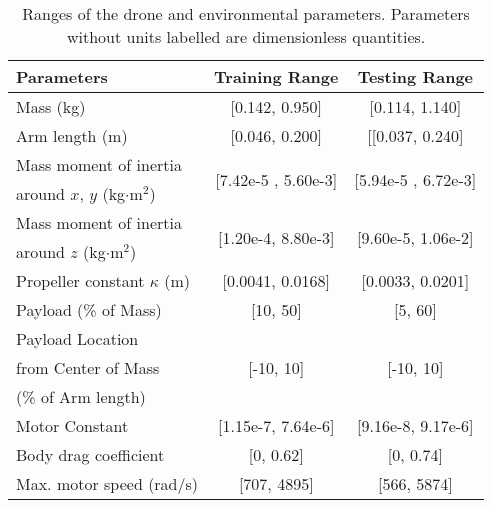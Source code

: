   
\begin{table}[t]
\setlength{\tabcolsep}{5.5pt}
\begin{center}
\begin{tabular}{lcc}
\toprule
 \textbf{Parameters} & \textbf{Training Range} & \textbf{Testing Range} \\
 \midrule
 Mass (kg) & [0.142, 0.950]  & [0.114, 1.140]  \\
 Arm length (m) & [0.046, 0.200] & [[0.037, 0.240] \\
 Mass moment of inertia  & \multirow{2}{*}{ [7.42e-5 , 5.60e-3]}&\multirow{2}{*}{ [5.94e-5 , 6.72e-3]} \\
 around $x$, $y$ (kg$\cdot$m$^2$)&&\\
  Mass moment of inertia  & \multirow{2}{*}{[1.20e-4, 8.80e-3]} &  \multirow{2}{*}{[9.60e-5, 1.06e-2]} \\
  around $z$ (kg$\cdot$m$^2$)&&\\
 Propeller constant $\kappa$ (m) & [0.0041, 0.0168] & [0.0033, 0.0201]\\
 Payload (\% of Mass)  & [10, 50] & [5, 60] \\
 Payload Location & \multirow{3}{*}{[-10, 10]}  & \multirow{3}{*}{[-10, 10]}  \\
 from Center of Mass&&\\
 (\% of Arm length)&&\\
 Motor Constant & [1.15e-7, 7.64e-6] & [9.16e-8, 9.17e-6]  \\
 Body drag coefficient & [0, 0.62]& [0, 0.74] \\
 Max. motor speed (rad/s) & [707, 4895] & [566, 5874] \\
\bottomrule
\end{tabular}
\vspace{1ex}
\caption{\label{tab:randomization} Ranges of the drone and environmental parameters. Parameters without units labelled are dimensionless quantities.}
\end{center}
\end{table}



